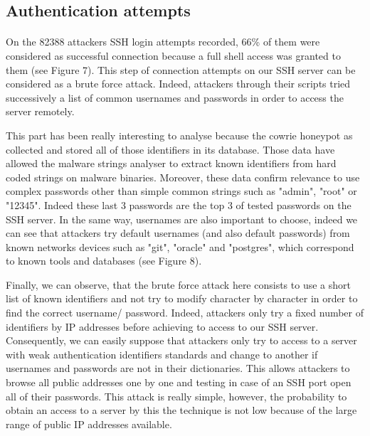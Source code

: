 

\subsection{Authentication attempts}

\paragraph{} %

On the 82388 attackers SSH login attempts recorded, 66\% of them were considered as 
successful connection because a full shell access was granted to them (see Figure 7). This step of 
connection attempts on our SSH server can be considered as a brute force attack. Indeed,
attackers through their scripts tried successively a list of common usernames and passwords
in order to access the server remotely.


This part has been really interesting to analyse because the cowrie honeypot as collected
and stored all of those identifiers in its database. Those data have allowed the malware
strings analyser to extract known identifiers from hard coded strings on malware binaries.
Moreover, these data confirm relevance to use complex passwords other than simple common
strings such as "admin", "root" or "12345". Indeed these last 3 passwords are the top 3 of 
tested passwords on the SSH server. In the same way, usernames are also important to choose,
indeed we can see that attackers try default usernames (and also default passwords) from
known networks devices such as "git", "oracle" and "postgres", which correspond to known
tools and databases (see Figure 8).


Finally, we can observe, that the brute force attack here consists to use a short list of known 
identifiers and not try to modify character by character in order to find the correct username/
password. Indeed, attackers only try a fixed number of identifiers by IP addresses before achieving
to access to our SSH server. Consequently, we can easily suppose that attackers only try
to access to a server with weak authentication identifiers standards and change to another if 
usernames and passwords are not in their dictionaries. This allows attackers to browse all
public addresses one by one and testing in case of an SSH port open all of their passwords.
This attack is really simple, however, the probability to obtain an access to a server by this
the technique is not low because of the large range of public IP addresses available.

